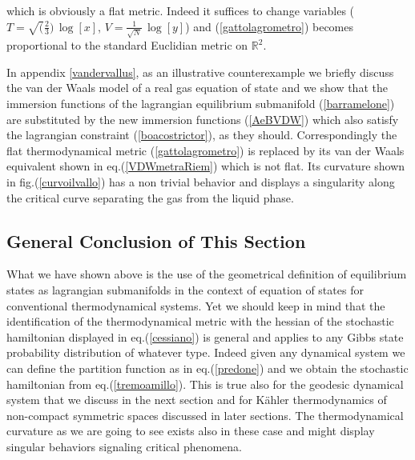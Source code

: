 \documentclass[10pt,a4paper]{article}
\newcommand{\ft}[2]{{\textstyle\frac{#1}{#2}}}
\begin{document}
which is obviously a flat metric. Indeed it suffices to change variables ($T=\sqrt(\ft 2 3) \,\log[x]$, $V=\frac{1}{\sqrt{N}} \, \log[y]$) and (\ref{gattolagrometro}) becomes proportional to the standard Euclidian metric on $\mathbb{R}^2$.
\par
In appendix \ref{vandervallus}, as an illustrative counterexample we briefly discuss the van der Waals model of a
real gas equation of state and we show that the immersion functions of the lagrangian equilibrium submanifold
(\ref{barramelone}) are substituted by the new immersion functions (\ref{AeBVDW}) which also satisfy the
lagrangian constraint (\ref{boacostrictor}), as they should. Correspondingly the flat thermodynamical metric
(\ref{gattolagrometro}) is replaced by its van der Waals equivalent shown in eq.(\ref{VDWmetraRiem}) which is not flat. Its curvature shown in fig.(\ref{curvoilvallo}) has a non trivial behavior and displays a singularity along the critical curve separating the gas from the liquid phase.
\subsection{General Conclusion of This Section}
What we have shown above is the use of the geometrical definition of equilibrium states as lagrangian submanifolds in the context of equation of states for conventional thermodynamical systems. Yet we should keep in mind that the identification of the thermodynamical metric with the hessian of the stochastic hamiltonian  displayed in eq.(\ref{cessiano}) is general and applies to any Gibbs state probability distribution
of whatever type. Indeed given any dynamical system we can define the partition function as in eq.(\ref{predone}) and we obtain the stochastic hamiltonian from eq.(\ref{tremoamillo}). This is true also for the geodesic dynamical system that we discuss in the next section and for K\"ahler thermodynamics of non-compact symmetric spaces discussed in later sections. The thermodynamical curvature as we are going to see exists also in these case and might display singular behaviors signaling critical phenomena.
\end{document}
